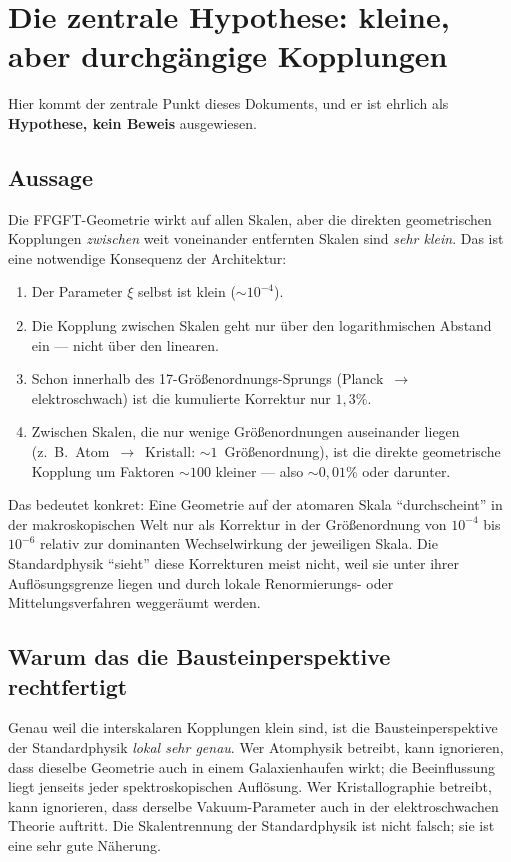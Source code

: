 \section{Die zentrale Hypothese: kleine, aber durchgängige Kopplungen}

Hier kommt der zentrale Punkt dieses Dokuments, und er ist ehrlich als
\textbf{Hypothese, kein Beweis} ausgewiesen.

\subsection*{Aussage}

Die FFGFT-Geometrie wirkt auf allen Skalen, aber die direkten
geometrischen Kopplungen \emph{zwischen} weit voneinander entfernten
Skalen sind \emph{sehr klein}. Das ist eine notwendige Konsequenz der
Architektur:

\begin{enumerate}\setlength\itemsep{2pt}
  \item Der Parameter $\xi$ selbst ist klein ($\sim 10^{-4}$).
  \item Die Kopplung zwischen Skalen geht nur über den
        logarithmischen Abstand ein --- nicht über den linearen.
  \item Schon innerhalb des 17-Größenordnungs-Sprungs (Planck~$\to$
        elektroschwach) ist die kumulierte Korrektur nur $1{,}3\%$.
  \item Zwischen Skalen, die nur wenige Größenordnungen auseinander
        liegen (z.~B.\ Atom~$\to$~Kristall: $\sim 1$~Größenordnung),
        ist die direkte geometrische Kopplung um Faktoren $\sim 100$
        kleiner --- also $\sim 0{,}01\%$ oder darunter.
\end{enumerate}

Das bedeutet konkret: Eine Geometrie auf der atomaren Skala
``durchscheint'' in der makroskopischen Welt nur als Korrektur in der
Größenordnung von $10^{-4}$ bis $10^{-6}$ relativ zur dominanten
Wechselwirkung der jeweiligen Skala. Die Standardphysik ``sieht'' diese
Korrekturen meist nicht, weil sie unter ihrer Auflösungsgrenze liegen
und durch lokale Renormierungs- oder Mittelungsverfahren weggeräumt
werden.

\subsection*{Warum das die Bausteinperspektive rechtfertigt}

Genau weil die interskalaren Kopplungen klein sind, ist die
Bausteinperspektive der Standardphysik \emph{lokal sehr genau}. Wer
Atomphysik betreibt, kann ignorieren, dass dieselbe Geometrie auch in
einem Galaxienhaufen wirkt; die Beeinflussung liegt jenseits jeder
spektroskopischen Auflösung. Wer Kristallographie betreibt, kann
ignorieren, dass derselbe Vakuum-Parameter auch in der elektroschwachen
Theorie auftritt. Die Skalentrennung der Standardphysik ist nicht
falsch; sie ist eine sehr gute Näherung.

